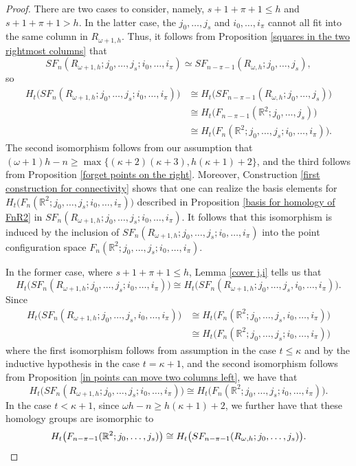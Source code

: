 \documentclass[pagebackref,colorlinks,citecolor=blue,linkcolor=blue,urlcolor=blue,filecolor=blue]{article}
\theoremstyle{definition}\newtheorem{definition}[thm]{Definition}
\theoremstyle{definition}
\newcommand{\R}{\ensuremath{\mathbb{R}}}
\begin{document}
\begin{proof}
There are two cases to consider, namely, $ s+1+\pi+1\le h$ and $s+1+\pi+1>h$.
In the latter case, the $j_{0}, \dots, j_{s}$ and $i_{0}, \dots, i_{\pi}$ cannot all fit into the same column in $R_{\omega+1, h}$.
Thus, it follows from Proposition \ref{squares in the two rightmost columns} that 
\[
SF_{n}(R_{\omega+1, h}; j_{0}, \dots, j_{s}; i_{0}, \dots, i_{\pi})\simeq SF_{n-\pi-1}(R_{\omega, h}; j_{0}, \dots, j_{s}),
\]
so
\begin{align*}
H_{t}\big(SF_{n}(R_{\omega+1, h}; j_{0}, \dots, j_{s}; i_{0}, \dots, i_{\pi})\big)&\cong H_{t}\big(SF_{n-\pi-1}(R_{\omega, h}; j_{0}, \dots, j_{s})\big)\\
&\cong H_{t}\big(F_{n-\pi-1}(\R^{2}; j_{0}, \dots, j_{s})\big)\\
&\cong H_{t}\big(F_{n}(\R^{2}; j_{0}, \dots, j_{s}; i_{0}, \dots, i_{\pi})\big).
\end{align*}
The second isomorphism follows from our assumption that $(\omega+1)h-n\ge\max\big\{(\kappa+2)(\kappa+3), h(\kappa+1)+2\big\}$, and the third follows from Proposition \ref{forget points on the right}.
Moreover, Construction 
\ref{first construction for connectivity} 
shows that one can realize the basis elements for $H_{t}\big(F_{n}(\R^{2}; j_{0}, \dots, j_{s}; i_{0}, \dots, i_{\pi})\big)$ described in Proposition \ref{basis for homology of FnR2} in $SF_{n}(R_{\omega+1, h}; j_{0}, \dots, j_{s}; i_{0}, \dots, i_{\pi})$.
It follows that this isomorphism is induced by the inclusion of $SF_{n}(R_{\omega+1, h}; j_{0}, \dots, j_{s}; i_{0}, \dots, i_{\pi})$ into the point configuration space $F_{n}(\R^{2}; j_{0}, \dots, j_{s}; i_{0}, \dots, i_{\pi})$.

In the former case, where $s+1+\pi+1\le h$, Lemma \ref{cover j,i} tells us that
\[
H_{t}\big(SF_{n}(R_{\omega+1, h}; j_{0}, \dots, j_{s}; i_{0}, \dots, i_{\pi})\big)\cong H_{t}\big(SF_{n}(R_{\omega+1, h}; j_{0}, \dots, j_{s}, i_{0}, \dots, i_{\pi})\big).
\]
Since
\begin{align*}
H_{t}\big(SF_{n}(R_{\omega+1, h}; j_{0}, \dots, j_{s}, i_{0}, \dots, i_{\pi})\big)&\cong H_{t}\big(F_{n}(\R^{2}; j_{0}, \dots, j_{s}, i_{0}, \dots, i_{\pi})\big)\\
&\cong H_{t}\big(F_{n}(\R^{2}; j_{0}, \dots, j_{s}; i_{0}, \dots, i_{\pi})\big)
\end{align*}
where the first isomorphism follows from assumption in the case $t\le \kappa$ and by the inductive hypothesis in the case $t=\kappa+1$, and the second isomorphism follows from Proposition \ref{in points can move two columns left}, we
have that
\[
H_{t}\big(SF_{n}(R_{\omega+1, h}; j_{0}, \dots, j_{s}; i_{0}, \dots, i_{\pi})\big)\cong H_{t}\big(F_{n}(\R^{2}; j_{0}, \dots, j_{s}; i_{0}, \dots, i_{\pi})\big).
\]
In the case $t<\kappa+1$, since $\omega h-n\ge h(\kappa+1)+2$, we further have that these homology groups are isomorphic to 
\[
H_{t}\big(F_{n-\pi-1}(\R^{2}; j_{0}, \dots, j_{s})\big)\\
\cong H_{t}\big(SF_{n-\pi-1}(R_{\omega, h}; j_{0}, \dots, j_{s})\big).
\]


\end{proof}
\end{document}
